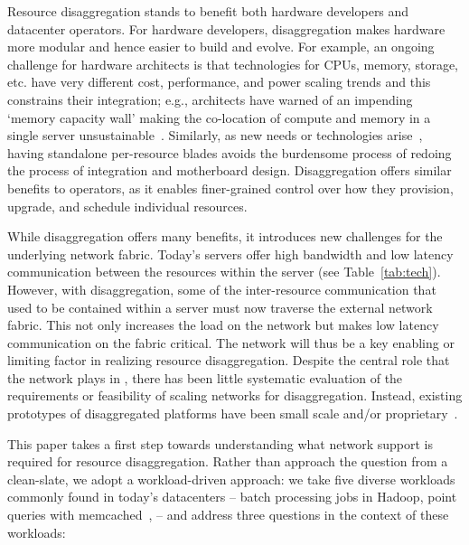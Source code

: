 Resource disaggregation stands to benefit both hardware developers and datacenter operators. %
For hardware developers, disaggregation makes hardware more modular and hence 
easier to build and evolve. 
For example, an ongoing challenge for hardware architects is that technologies for CPUs, memory, storage, etc. have very different cost, performance, and power scaling trends and this constrains their integration; e.g., architects have warned of an impending `memory capacity wall' making the co-location of compute and memory in a single server unsustainable~\cite{ddcHwDesign1}. 
Similarly, as new needs or technologies arise~\cite{memristors,nvram,reg-ex-hardware,gpus}, having standalone per-resource blades avoids the burdensome process of redoing the process of integration and motherboard design.
Disaggregation offers similar benefits to operators, as it enables finer-grained control over how they  provision, upgrade, and schedule individual resources.

While disaggregation offers many benefits, it introduces new challenges for the underlying network fabric. Today's servers offer high bandwidth and low latency communication between the resources within the server (see Table~\ref{tab:tech}). However, with disaggregation, some of the inter-resource communication that used to be contained within a server must now traverse the external network fabric. This not only increases the load on the network but makes low latency communication on the fabric critical. The network will thus be a key enabling or limiting factor in realizing resource disaggregation. 
Despite the central role that the network plays in \dis, there has been little systematic evaluation of the requirements or feasibility of scaling networks for disaggregation. Instead, existing prototypes of disaggregated platforms have been small scale and/or proprietary~\cite{rsa, hptm, fdr, seamicro}. 

This paper takes a first step towards understanding what network support is required for resource disaggregation. Rather than approach the question from a clean-slate, we adopt a workload-driven approach: we take five diverse workloads commonly found in today's datacenters -- batch processing jobs in Hadoop, point queries with memcached~\cite{memcached},  -- and address three questions in the context of these workloads: 

